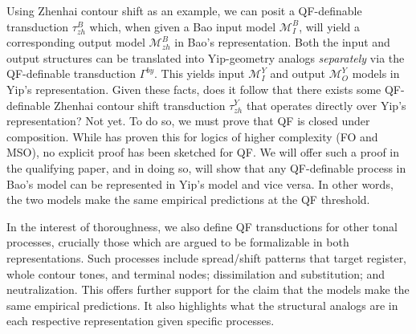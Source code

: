 \documentclass{article}
\begin{document}
Using Zhenhai contour shift as an example, we can posit a QF-definable transduction $\tau^{B}_{zh}$ which, when given a Bao input model $\mathcal{M}^{B}_{I}$, will yield a corresponding output model $\mathcal{M}^{B}_{zh}$ in Bao's representation. Both the input and output structures can be translated into Yip-geometry analogs \emph{separately} via the QF-definable transduction $\Gamma^{by}$. This yields input $\mathcal{M}^{Y}_{I}$ and output $\mathcal{M}^{Y}_{O}$ models in Yip's representation. Given these facts, does it follow that there exists some QF-definable Zhenhai contour shift transduction $\tau^{Y}_{zh}$ that operates directly over Yip's representation? Not yet. To do so, we must prove that QF is closed under composition. While \citet{Courcelle1994} has proven this for logics of higher complexity (FO and MSO), no explicit proof has been sketched for QF. We will offer such a proof in the qualifying paper, and in doing so, will show that any QF-definable process in Bao's model can be represented in Yip's model and vice versa. In other words, the two models make the same empirical predictions at the QF threshold. \par
In the interest of thoroughness, we also define QF transductions for other tonal processes, crucially those which are argued to be formalizable in both representations. Such processes include spread/shift patterns that target register, whole contour tones, and terminal nodes; dissimilation and substitution; and neutralization. This offers further support for the claim that the models make the same empirical predictions. It also highlights what the structural analogs are in each respective representation given specific processes.
\end{document}
